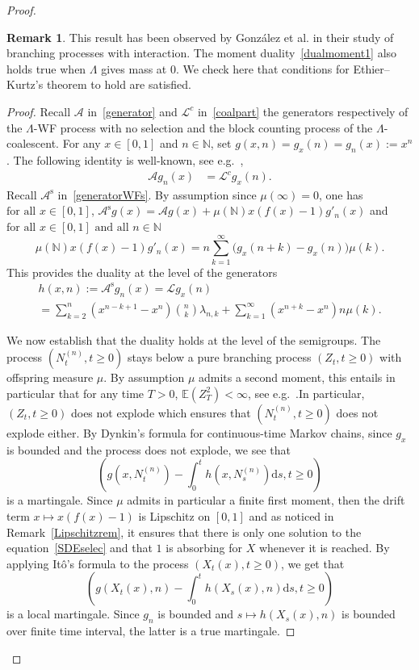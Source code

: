 \documentclass[10pt]{amsart}
\theoremstyle{definition}\newtheorem{defi}[theo]{Definition}\newtheorem{rema}[theo]{Remark}\newtheorem{exam}[theo]{Example}\newtheorem{exem}[theo]{Example}\newtheorem{nota}[theo]{Notation}
\newcommand{\ddr}{\mathrm{d}}
\newcommand{\rms}{\mathrm{s}}
\newcommand{\bbN}{\mathbb{N}}
\newcommand{\bbE}{\mathbb{E}}
\newcommand{\clA}{\mathcal{A}}
\newcommand{\clL}{\mathcal{L}}
\begin{document}
\begin{proof}
\begin{rema}\label{remKing}
This result has been observed by González et al. \cite[Lemma~2]{Gonzalesetal} in their study of branching processes with interaction. The moment duality~\eqref{dualmoment1} also holds true when $\Lambda$ gives mass at $0$. We check here that conditions for Ethier--Kurtz's theorem to hold are satisfied.
\end{rema}

\begin{proof}
Recall $\clA$ in~\eqref{generator} and $\clL^{c}$ in~\eqref{coalpart} the generators respectively of the $\Lambda$-WF process with no selection and the block counting process of the $\Lambda$-coalescent. For any $x\in [0,1]$ and $n\in \bbN$, set $g(x,n)= g_x(n)=g_n(x):=x^{n}$. The following identity is well-known, see e.g.~\cite[Lemma~2]{Gonzalesetal},
\begin{align}
\clA g_n(x)&=\clL^{c}g_x(n).
\end{align}
Recall $\clA^{\rms}$ in~\eqref{generatorWFs}. By assumption since $\mu(\infty)=0$, one has $\text{for all } x\in [0,1]$, $\clA^{\rms}g(x)=\clA g(x)+\mu(\bbN)x(f(x)-1)g'_n(x)$ and $\text{for all } x\in [0,1] \text{ and all } n\in \bbN$
\[
\mu(\bbN)x(f(x)-1)g'_n(x)=n\sum_{k=1}^{\infty}\big(g_x(n+k)-g_x(n)\big)\mu(k).
\]
This provides the duality at the level of the generators
\begin{multline}\label{expressionh}
h(x,n):=\clA^{\rms}g_n(x)=\clL g_x(n)\\
= \sum_{k=2}^{n}\left(x^{n-k+1}-x^{n}\right)\binom{n}{k}\lambda_{n,k}+\sum_{k=1}^{\infty}\left(x^{n+k}-x^{n}\right)n\mu(k).
\end{multline}

We now establish that the duality holds at the level of the semigroups. The process $(N_t^{(n)},t\geq 0)$ stays below a pure branching process $(Z_t,t\geq 0)$ with offspring measure $\mu$. By assumption $\mu$ admits a second moment, this entails in particular that for any time $T>0$, $\bbE(Z_T^{2})<\infty$, see e.g.~\cite[Chapter~3, Corollary~1 p.~111]{MR2047480}.\linebreak In particular, $(Z_t,t\geq 0)$ does not explode which ensures that $(N^{(n)}_t,t\geq 0)$ does not explode either. By Dynkin's formula for continuous-time Markov chains, since $g_x$ is bounded and the process does not explode, we see that
\[
\left(g\left(x,N_{t}^{(n)}\right)-\int_{0}^{t}h\left(x,N_s^{(n)}\right)\ddr s, t\geq 0\right)
\]
is a martingale. Since $\mu$ admits in particular a finite first moment, then the drift term $x\mapsto x(f(x)-1)$ is Lipschitz on $[0,1]$ and as noticed in Remark~\ref{Lipschitzrem}, it ensures that there is only one solution to the equation~\eqref{SDEselec} and that $1$ is absorbing for $X$ whenever it is reached. By applying Itô's formula to the process $(X_t(x),t\geq 0)$, we get that
\[
\left(g(X_{t}(x),n)-\int_{0}^{t}h(X_s(x),n)\ddr s, t\geq 0\right)
\]
is a local martingale. Since $g_n$ is bounded and $s\mapsto h(X_s(x),n)$ is bounded over finite time interval, the latter is a true martingale.


\end{proof}
\end{proof}
\end{document}

